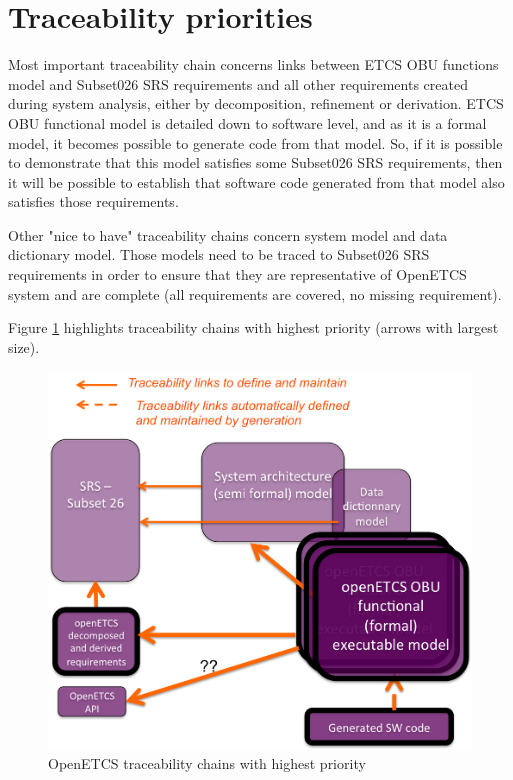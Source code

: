 \documentclass[11pt]{template/openetcs_report}
\begin{document}
\section{Traceability priorities}
\label{sec-3-1} 
Most important traceability chain concerns links between ETCS OBU functions model and Subset026 SRS requirements and all other requirements created during system analysis, either by decomposition, refinement or derivation. 
ETCS OBU functional model is detailed down to software level, and as it is a formal model, it becomes possible to generate code from that model. So, if it is possible to demonstrate that this model satisfies some Subset026 SRS requirements, then it will be possible to establish that software code generated from that model also satisfies those requirements.

Other "nice to have" traceability chains concern system model and data dictionary model. Those models need to be traced to Subset026 SRS requirements in order to ensure that they are representative of OpenETCS system and are complete (all requirements are covered, no missing requirement). 

Figure \ref{fig:openETCSTraceabilityMainPriority} highlights traceability chains with highest priority (arrows with largest size).

\begin{figure}[htb]
\centering
\includegraphics[width=.9\linewidth]
{./images/openETCSTraceabilityMainPriority.png}
\caption{\label{fig:openETCSTraceabilityMainPriority}OpenETCS traceability chains with highest priority}
\end{figure}
\end{document}
